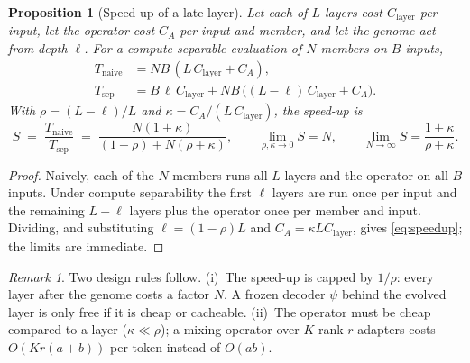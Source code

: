 \documentclass[11pt,a4paper]{article}
\theoremstyle{definition}
\theoremstyle{plain}
\newtheorem{proposition}[definition]{Proposition}
\theoremstyle{remark}
\newtheorem{remark}[definition]{Remark}
\begin{document}
\begin{proposition}[Speed-up of a late layer]
\label{prop:cost}
Let each of $L$ layers cost $C_{\text{layer}}$ per input, let the operator cost $C_A$ per input and member, and let the genome act from depth $\ell$. For a compute-separable evaluation of $N$ members on $B$ inputs,
\begin{align}
T_{\text{naive}} &= N B\,(L\,C_{\text{layer}} + C_A),\\
T_{\text{sep}} &= B\,\ell\,C_{\text{layer}} + N B\,\big((L-\ell)\,C_{\text{layer}} + C_A\big).
\end{align}
With $\rho = (L-\ell)/L$ and $\kappa = C_A/(L\,C_{\text{layer}})$, the speed-up is
\begin{equation}
\label{eq:speedup}
S \;=\; \frac{T_{\text{naive}}}{T_{\text{sep}}} \;=\; \frac{N(1+\kappa)}{(1-\rho) + N(\rho+\kappa)},
\qquad
\lim_{\rho,\kappa\to0} S = N,
\qquad
\lim_{N\to\infty} S = \frac{1+\kappa}{\rho+\kappa}.
\end{equation}
\end{proposition}
\begin{proof}
Naively, each of the $N$ members runs all $L$ layers and the operator on all $B$ inputs. Under compute separability the first $\ell$ layers are run once per input and the remaining $L-\ell$ layers plus the operator once per member and input. Dividing, and substituting $\ell = (1-\rho)L$ and $C_A = \kappa L C_{\text{layer}}$, gives \cref{eq:speedup}; the limits are immediate.
\end{proof}

\begin{remark}
Two design rules follow. (i)~The speed-up is capped by $1/\rho$: every layer after the genome costs a factor $N$. A frozen decoder $\psi$ behind the evolved layer is only free if it is cheap or cacheable. (ii)~The operator must be cheap compared to a layer ($\kappa \ll \rho$); a mixing operator over $K$ rank-$r$ adapters costs $O(Kr(a+b))$ per token instead of $O(ab)$.
\end{remark}
\end{document}
